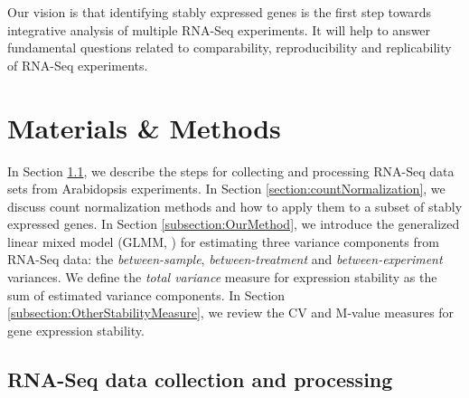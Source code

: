 \documentclass[fleqn,10pt,lineno]{wlpeerj} %
\begin{document}
Our vision is that identifying stably expressed genes is the first step
towards integrative analysis of multiple RNA-Seq experiments. It will help to
answer fundamental questions related to  comparability, reproducibility and
replicability of RNA-Seq experiments.

\section{Materials \& Methods} 
\label{section:Methods}
In Section \ref{section:DataCollection}, we describe the steps for collecting
and processing RNA-Seq data sets from Arabidopsis experiments.  In Section
\ref{section:countNormalization}, we discuss count normalization methods and
how to apply them to a subset of stably expressed genes.
In Section \ref{subsection:OurMethod},  we introduce the generalized linear
mixed model (GLMM, \citealt{mcculloch2001generalized}) for estimating three
variance components from RNA-Seq data: the \textit{between-sample},
\textit{between-treatment} and \textit{between-experiment} variances.  We
define the \textit{total variance} measure for expression stability as the sum
of estimated variance components.  In Section
\ref{subsection:OtherStabilityMeasure}, we review the CV and M-value measures
for gene expression stability.



\subsection{RNA-Seq data collection and processing}\label{section:DataCollection} 
\end{document}
